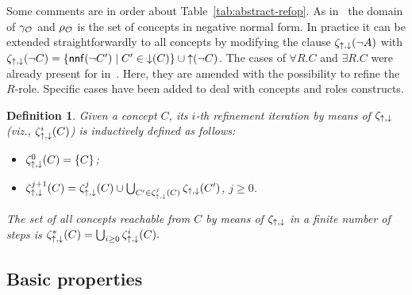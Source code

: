 \documentclass[
]{ceurart}
\newtheorem{definition}{Definition}
\begin{document}
Some comments are in order about Table~\ref{tab:abstract-refop}.
%
 As in~\cite{troquard2018repairing} the domain of $\gamma_\mathcal{O}$ and $\rho_\mathcal{O}$ is the set of concepts in negative normal form. In practice it can be extended straightforwardly to all concepts by modifying the clause 
$\zeta_{\mathop{\uparrow},\mathop{\downarrow}}(\lnot A)$ with 
%
$\zeta_{\mathop{\uparrow},\mathop{\downarrow}}(\lnot C) = \{ \mathsf{nnf}(\lnot C') \mid C' \in \mathop{\downarrow}(C) \} \cup \mathop{\uparrow}(\lnot C)$.
%
The cases of $\forall R. C$ and $\exists R.C$ were already present for \ALC in~\cite{troquard2018repairing}. Here, they are amended with the possibility to refine the $R$-role. Specific cases have been added to deal with \SROIQ concepts and roles constructs. %
%

\begin{definition}
  Given a \DL concept $C$, its \emph{$i$-th refinement iteration} by means of $\zeta_{\mathop{\uparrow},\mathop{\downarrow}}$ (viz., $\zeta_{\mathop{\uparrow},\mathop{\downarrow}}^i(C)$) is inductively defined 
  as follows:
  \begin{itemize}
  \item $\zeta_{\mathop{\uparrow},\mathop{\downarrow}}^0(C) = \{C\}$;
  \item $\zeta_{\mathop{\uparrow},\mathop{\downarrow}}^{j+1}(C) = \zeta_{\mathop{\uparrow},\mathop{\downarrow}}^j(C) \cup \bigcup_{C' \in \zeta_{\mathop{\uparrow},\mathop{\downarrow}}^j(C)} \zeta_{\mathop{\uparrow},\mathop{\downarrow}}(C')$, \quad $j \geq 0$.
  \end{itemize}
The set of all concepts reachable from $C$ by means of $\zeta_{\mathop{\uparrow},\mathop{\downarrow}}$ in a finite number of steps is
$\zeta_{\mathop{\uparrow},\mathop{\downarrow}}^*(C) = \bigcup_{i \geq 0} \zeta_{\mathop{\uparrow},\mathop{\downarrow}}^i(C).
$
\end{definition}



\subsection{Basic properties}
\end{document}
